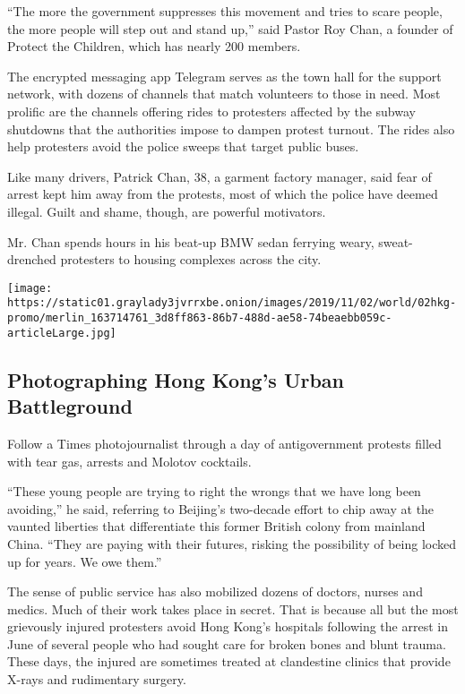 ``The more the government suppresses this movement and tries to scare
people, the more people will step out and stand up,'' said Pastor Roy
Chan, a founder of Protect the Children, which has nearly 200 members.

The encrypted messaging app Telegram serves as the town hall for the
support network, with dozens of channels that match volunteers to those
in need. Most prolific are the channels offering rides to protesters
affected by the subway shutdowns that the authorities impose to dampen
protest turnout. The rides also help protesters avoid the police sweeps
that target public buses.

Like many drivers, Patrick Chan, 38, a garment factory manager, said
fear of arrest kept him away from the protests, most of which the police
have deemed illegal. Guilt and shame, though, are powerful motivators.

Mr. Chan spends hours in his beat-up BMW sedan ferrying weary,
sweat-drenched protesters to housing complexes across the city.

\href{https://www.nytimes3xbfgragh.onion/interactive/2019/11/02/world/asia/hong-kong-protest-photos.html}{}

\texttt{[image: https://static01.graylady3jvrrxbe.onion/images/2019/11/02/world/02hkg-promo/merlin\_163714761\_3d8ff863-86b7-488d-ae58-74beaebb059c-articleLarge.jpg]}

\hypertarget{photographing-hong-kongs-urban-battleground}{%
\subsection{Photographing Hong Kong's Urban
Battleground}\label{photographing-hong-kongs-urban-battleground}}

Follow a Times photojournalist through a day of antigovernment protests
filled with tear gas, arrests and Molotov cocktails.

``These young people are trying to right the wrongs that we have long
been avoiding,'' he said, referring to Beijing's two-decade effort to
chip away at the vaunted liberties that differentiate this former
British colony from mainland China. ``They are paying with their
futures, risking the possibility of being locked up for years. We owe
them.''

The sense of public service has also mobilized dozens of doctors, nurses
and medics. Much of their work takes place in secret. That is because
all but the most grievously injured protesters avoid Hong Kong's
hospitals following the arrest in June of several people who had sought
care for broken bones and blunt trauma. These days, the injured are
sometimes treated at clandestine clinics that provide X-rays and
rudimentary surgery.

